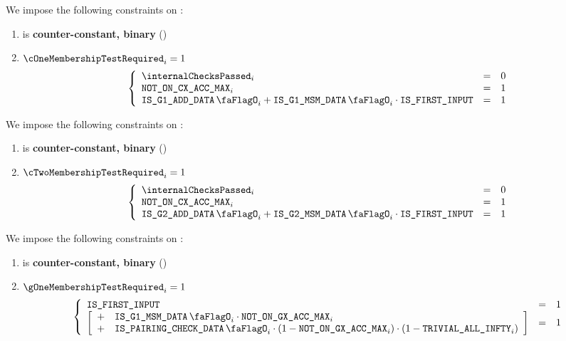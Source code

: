 We impose the following constraints on \cOneMembershipTestRequired{}:
\begin{enumerate}
    \item \cOneMembershipTestRequired{} is \textbf{counter-constant, binary} \quad (\trash)
    \item \If $\cOneMembershipTestRequired_{i} = 1$ \Then
        \[
            \left\{ \begin{array}{lcl}
                \internalChecksPassed _{i} & = & 0 \\
                \notOnCXAccMax_{i}         & = & 1 \\
                \isBlsGOneAddData_{i} + \isBlsGOneMsmData_{i} \cdot \isFirstInput & = & 1 \\
            \end{array} \right.
        \]
\end{enumerate}
\noindent
We impose the following constraints on \cTwoMembershipTestRequired{}:
\begin{enumerate}
    \item \cTwoMembershipTestRequired{} is \textbf{counter-constant, binary} \quad (\trash)
    \item \If $\cTwoMembershipTestRequired_{i} = 1$ \Then
        \[
            \left\{ \begin{array}{lcl}
                \internalChecksPassed _{i} & = & 0 \\
                \notOnCXAccMax_{i}         & = & 1 \\
                \isBlsGTwoAddData_{i} + \isBlsGTwoMsmData_{i} \cdot \isFirstInput & = & 1 \\
            \end{array} \right.
        \]
\end{enumerate}
\noindent
We impose the following constraints on \gOneMembershipTestRequired{}:
\begin{enumerate}
    \item \gOneMembershipTestRequired{} is \textbf{counter-constant, binary} \quad (\trash)
    \item \If $\gOneMembershipTestRequired_{i} = 1$ \Then
        \[
            \left\{ \begin{array}{lcl}
                \isFirstInput & = & 1 \\
                \left[ \begin{array}{cl}
                    + & \isBlsGOneMsmData_{i} \cdot \notOnGXAccMax_{i}  \\
                    + & \isBlsPairingCheckData_{i} \cdot (1 - \notOnGXAccMax_{i}) \cdot (1 - \trivialAllInf_{i}) \\
                \end{array} \right] & = & 1 \\
            \end{array} \right.
        \]
\end{enumerate}
